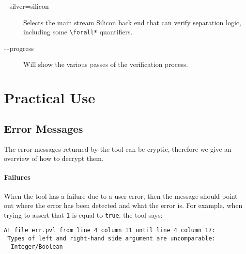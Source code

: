 \begin{description}
\item[-\,-silver=silicon] Selects the main stream Silicon back end that can verify separation logic,
including some \lstinline+\forall*+ quantifiers.
\item[-\,-progress] Will show the various passes of the verification process.
\end{description}

\section{Practical Use}

\subsection{Error Messages}

The error messages returned by the tool can be cryptic, therefore we
give an overview of how to decrypt them.

\paragraph{Failures}

When the tool has a failure due to a user error, then the message should point out where
the error has been detected and what the error is. For example, when trying to
assert that \verb+1+ is equal to \verb+true+, the tool says:
\begin{verbatim}
At file err.pvl from line 4 column 11 until line 4 column 17:
 Types of left and right-hand side argument are uncomparable:
  Integer/Boolean
\end{verbatim}

